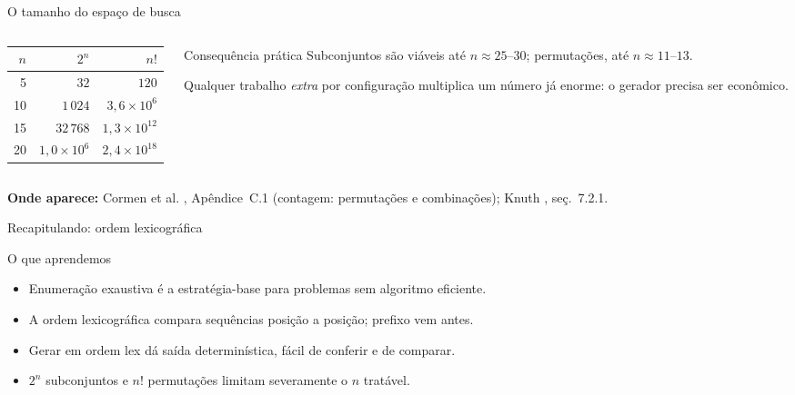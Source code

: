 \documentclass[aspectratio=169]{beamer}
\newcommand{\fonte}[1]{%
  \par\vspace{1pt}%
  {\tiny\color{gray!30!black}\textbf{Onde aparece:} #1\par}}
\begin{document}
\begin{frame}{O tamanho do espaço de busca}
  \begin{columns}[T]
    \begin{column}{0.52\textwidth}
      \centering
      \begin{tabular}{@{}rrr@{}}
        \toprule
        $n$ & $2^n$ & $n!$ \\
        \midrule
        5  & $32$        & $120$ \\
        10 & $1\,024$    & $3{,}6 \times 10^{6}$ \\
        15 & $32\,768$   & $1{,}3 \times 10^{12}$ \\
        20 & $1{,}0 \times 10^{6}$ & $2{,}4 \times 10^{18}$ \\
        \bottomrule
      \end{tabular}
    \end{column}
    \begin{column}{0.44\textwidth}
      \begin{alertblock}{Consequência prática}
        Subconjuntos são viáveis até $n \approx 25$--$30$;
        permutações, até $n \approx 11$--$13$.
      \end{alertblock}
      Qualquer trabalho \emph{extra} por configuração multiplica um número
      já enorme: o gerador precisa ser econômico.
    \end{column}
  \end{columns}
  \fonte{Cormen et al. \cite{cormen2012algoritmos}, Apêndice~C.1 (contagem: permutações e
    combinações); Knuth \cite{knuth2011taocp4a}, seç.~7.2.1.}
\end{frame}

\begin{frame}{Recapitulando: ordem lexicográfica}
  \begin{block}{O que aprendemos}
    \begin{itemize}
      \item Enumeração exaustiva é a estratégia-base para problemas sem algoritmo eficiente.
      \item A ordem lexicográfica compara sequências posição a posição; prefixo vem antes.
      \item Gerar em ordem lex dá saída determinística, fácil de conferir e de comparar.
      \item $2^n$ subconjuntos e $n!$ permutações limitam severamente o $n$ tratável.
    \end{itemize}
  \end{block}
\end{frame}
\end{document}
